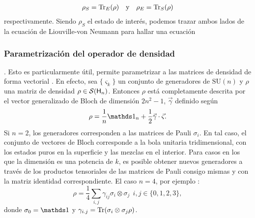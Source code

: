 \begin{align*}
    \rho_{S}=\Tr_{E}(\rho) & & \text{y} & & \rho_{E}=\Tr_{S}(\rho)
\end{align*}
respectivamente. Siendo $\rho_{S}$ el estado de interés, podemos trazar ambos lados de la ecuación de Liouville-von Neumann para hallar una ecuación 


\subsubsection{Parametrización del operador de densidad}
 . Esto es particularmente útil, permite parametrizar a las matrices de densidad de forma vectorial \cite{Bruning}. En efecto, sea $\{\varsigma_{k}\}$ un conjunto de generadores de $\text{SU}(n)$ y $\rho$ una matriz de densidad $\rho\in\mathcal{S}({\sf H}_{n})$. Entonces $\rho$ está completamente descrita por el vector generalizado de Bloch de dimensión $2n^{2}-1$, $\vec{\gamma}$ definido según
\begin{equation}
    \rho=\frac{1}{n}\Id_{n}+\frac{1}{2}\vec{\gamma}\cdot\vec{\varsigma}.
\end{equation}
Si $n=2$, los generadores corresponden a las matrices de Pauli $\sigma_{i}$. En tal caso, el conjunto de vectores de Bloch corresponde a la bola unitaria tridimensional, con los estados puros en la superficie y las mezclas en el interior. Para casos en los que la dimensión es una potencia de $k$, es posible obtener nuevos generadores a través de los productos tensoriales de las matrices de Pauli consigo mismas y con la matriz identidad correspondiente. El caso $n=4$, por ejemplo \cite{Chuang}:
\begin{equation}\label{eq::BlochParametrization4}
    \rho=\frac{1}{4}\sum_{i,j}\gamma_{ij}\sigma_{i}\otimes \sigma_{j} \ \ i,j\in\{0,1,2,3\},
\end{equation}
donde $\sigma_{0}=\Id$ y $\gamma_{i.j}=\Tr(\sigma_{i}\otimes \sigma_{j}\rho)$.
